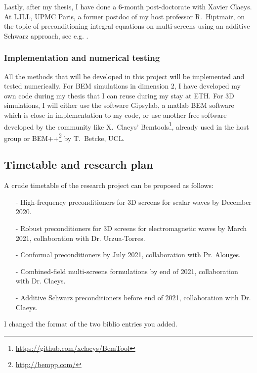\documentclass[]{report}
\newcommand{\ma}[1]{{\color{green}#1}}
\begin{document}
Lastly, after my thesis, I have done a 6-month post-doctorate with Xavier Claeys. At LJLL,
UPMC Paris, a former postdoc of my host professor R.~Hiptmair, on the topic of preconditioning integral
equations on multi-screens using an additive Schwarz approach, see e.g. \cite{marchand2019two}.

\subsubsection*{Implementation and numerical testing}

All the methods that will be developed in this project will be implemented and tested
numerically. For BEM simulations in dimension 2, I have developed my own code during my
thesis that I can reuse during my stay at ETH. For 3D simulations, I will either use the
software Gipsylab, a matlab BEM software which is close in implementation to my code, or
use another free software developed by the community like X.~Claeys'
Bemtools\footnote{\url{https://github.com/xclaeys/BemTool}}, already used in the host group
or BEM++\footnote{\url{http://bempp.com/}} by T.~Betcke, UCL.

\subsection{Timetable and research plan}

A crude timetable of the research project can be proposed as follows:
\begin{itemize}\itemsep-0.2em 
\item[-] High-frequency preconditioners for 3D screens for scalar waves by December 2020.
\item[-] Robust preconditioners for 3D screens for electromagnetic waves by March 2021,
  collaboration with Dr. Urzua-Torres.
\item[-] Conformal preconditioners by July 2021, collaboration with Pr. Alouges. 
\item[-] Combined-field multi-screens formulations by end of 2021, collaboration with Dr. Claeys. 
\item[-] Additive Schwarz preconditioners before end of 2021, collaboration with Dr. Claeys.
\end{itemize}

\ma{I changed the format of the two biblio entries you added.}
\end{document}
